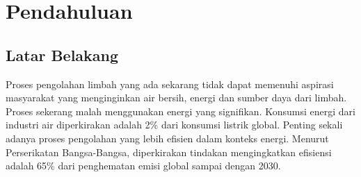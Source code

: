 \documentclass[10pt,a4paper,hidelinks]{article}
\begin{document}
    \pagestyle{plain}
    \title{\rmfamily\normalfont{}}
    \author{}
    \date{} %
    
    \maketitle
    
    \begin{abstract}
    	\noindent Proses pengolahan limbah sekarang meninggalkan banyak ruang untuk dikembangkan dan ditingkatkan. Limbah dapat menjadi sumber energi yang berharga --- sekitar 9 kali lebih banyak energi terkandung dalam limbah dibandingkan dengan energi yang diperlukan untuk mengolahnya dengan cara modern. Proses-proses yang tersedia sekerang jarang mempertimbangkan dan menggunakan hal ini, proses-proses ini juga sering tidak efisien dan 'kotor'.
Menggabungkan teknologi-teknologi pengolahan limbah menjadi sebuah proses yang berpusat pada Microbial Fuel Cell (MFC) dapat memecahkan masalah ini.
    \end{abstract}
       
    \tableofcontents
    \section{Pendahuluan}
    \subsection{Latar Belakang}
    Proses pengolahan limbah yang ada sekarang tidak dapat memenuhi aspirasi masyarakat yang menginginkan air bersih, energi dan sumber daya dari limbah. Proses sekerang malah menggunakan energi yang signifikan. Konsumsi energi dari industri air diperkirakan adalah 2\% dari konsumsi listrik global. Penting sekali adanya proses pengolahan yang lebih efisien dalam konteks energi. Menurut Perserikatan Bangsa-Bangsa, diperkirakan tindakan mengingkatkan efisiensi adalah 65\% dari penghematan emisi global sampai dengan 2030.
    
\end{document}
